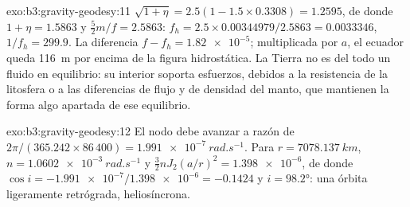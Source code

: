 \begin{solution}{exo:b3:gravity-geodesy:11}
$\sqrt{1 + \eta} = 2.5(1 - 1.5\times0.3308) = 1.2595$, de donde $1 + \eta = 1.5863$
y $\tfrac52m/f = 2.5863$: $f_h = 2.5\times0.00344979/2.5863 = \num{0.0033346}$,
$1/f_h = 299.9$. La diferencia $f - f_h = \num{1.82e-5}$; multiplicada por $a$, el
ecuador queda \qty{116}{m} por encima de la figura hidrostática. La Tierra no es del todo
un fluido en equilibrio: su interior soporta esfuerzos, debidos a la resistencia de
la litosfera o a las diferencias de flujo y de densidad del manto, que mantienen
la forma algo apartada de ese equilibrio.
\end{solution}

\begin{solution}{exo:b3:gravity-geodesy:12}
El nodo debe avanzar a razón de $2\pi/(365.242\times86\,400) =
\qty{1.991e-7}{rad.s^{-1}}$. Para $r = \qty{7078.137}{km}$, $n =
\qty{1.0602e-3}{rad.s^{-1}}$ y $\tfrac32nJ_2(a/r)^2 = \num{1.398e-6}$, de donde
$\cos i = -\num{1.991e-7}/\num{1.398e-6} = -0.1424$ y $i = \ang{98.2}$: una
órbita ligeramente retrógrada, heliosíncrona.
\end{solution}

